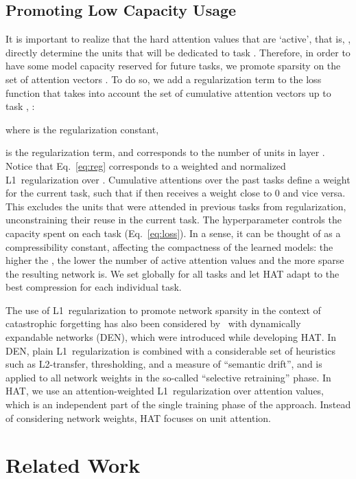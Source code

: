 \subsection{Promoting Low Capacity Usage}
\label{sec:Method_Compress}

It is important to realize that the hard attention values  that are `active', that is, , directly determine the units that will be dedicated to task . Therefore, in order to have some model capacity reserved for future tasks, we promote sparsity on the set of attention vectors . To do so, we add a regularization term to the loss function  that takes into account the set of cumulative attention vectors up to task , :

where  is the regularization constant, 

is the regularization term, and  corresponds to the number of units in layer . Notice that Eq.~\ref{eq:reg} corresponds to a weighted and normalized L1~regularization over . Cumulative attentions over the past tasks  define a weight for the current task, such that if  then  receives a weight close to 0 and vice versa. This excludes the units that were attended in previous tasks from regularization, unconstraining their reuse in the current task. 
The hyperparameter  controls the capacity spent on each task (Eq.~\ref{eq:loss}). In a sense, it can be thought of as a compressibility constant, affecting the compactness of the learned models: the higher the , the lower the number of active attention values  and the more sparse the resulting network is. We set  globally for all tasks and let HAT adapt to the best compression for each individual task. 

The use of L1~regularization to promote network sparsity in the context of catastrophic forgetting has also been considered by~\citet{Yoon18ICLR} with dynamically expandable networks (DEN), which were introduced while developing HAT. In DEN, plain L1~regularization is combined with a considerable set of heuristics such as L2-transfer, thresholding, and a measure of ``semantic drift'', and is applied to all network weights in the so-called ``selective retraining'' phase. In HAT, we use an attention-weighted L1~regularization over attention values, which is an independent part of the single training phase of the approach. Instead of considering network weights, HAT focuses on unit attention.



\section{Related Work}
\label{sec:SOTA}


